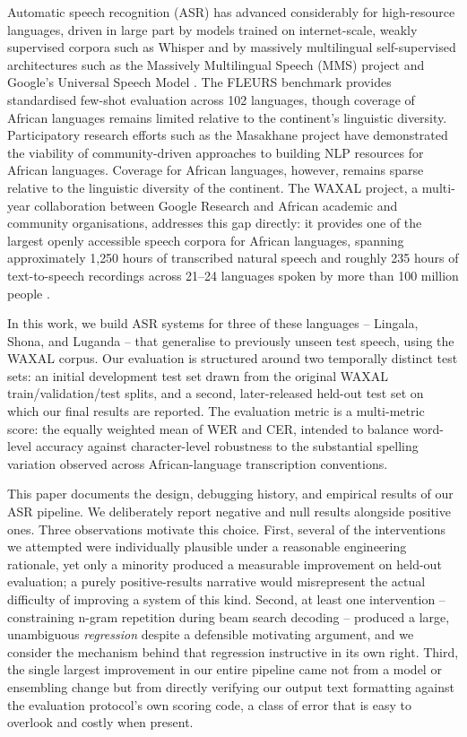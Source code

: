 \documentclass[11pt]{article}
\begin{document}
Automatic speech recognition (ASR) has advanced considerably for high-resource languages, driven in large part by models trained on internet-scale, weakly supervised corpora such as Whisper \cite{radford2023whisper} and by massively multilingual self-supervised architectures such as the Massively Multilingual Speech (MMS) project \cite{pratap2024mms} and Google's Universal Speech Model \cite{zhang2023usm}. The FLEURS benchmark \cite{conneau2023fleurs} provides standardised few-shot evaluation across 102 languages, though coverage of African languages remains limited relative to the continent's linguistic diversity. Participatory research efforts such as the Masakhane project \cite{nekoto2020masakhane} have demonstrated the viability of community-driven approaches to building NLP resources for African languages. Coverage for African languages, however, remains sparse relative to the linguistic diversity of the continent. The WAXAL project, a multi-year collaboration between Google Research and African academic and community organisations, addresses this gap directly: it provides one of the largest openly accessible speech corpora for African languages, spanning approximately 1{,}250 hours of transcribed natural speech and roughly 235 hours of text-to-speech recordings across 21--24 languages spoken by more than 100 million people \cite{diack2026waxal}.

In this work, we build ASR systems for three of these languages -- Lingala, Shona, and Luganda -- that generalise to previously unseen test speech, using the WAXAL corpus. Our evaluation is structured around two temporally distinct test sets: an initial development test set drawn from the original WAXAL train/validation/test splits, and a second, later-released held-out test set on which our final results are reported. The evaluation metric is a multi-metric score: the equally weighted mean of WER and CER, intended to balance word-level accuracy against character-level robustness to the substantial spelling variation observed across African-language transcription conventions.

This paper documents the design, debugging history, and empirical results of our ASR pipeline. We deliberately report negative and null results alongside positive ones. Three observations motivate this choice. First, several of the interventions we attempted were individually plausible under a reasonable engineering rationale, yet only a minority produced a measurable improvement on held-out evaluation; a purely positive-results narrative would misrepresent the actual difficulty of improving a system of this kind. Second, at least one intervention -- constraining n-gram repetition during beam search decoding -- produced a large, unambiguous \emph{regression} despite a defensible motivating argument, and we consider the mechanism behind that regression instructive in its own right. Third, the single largest improvement in our entire pipeline came not from a model or ensembling change but from directly verifying our output text formatting against the evaluation protocol's own scoring code, a class of error that is easy to overlook and costly when present.
\end{document}
